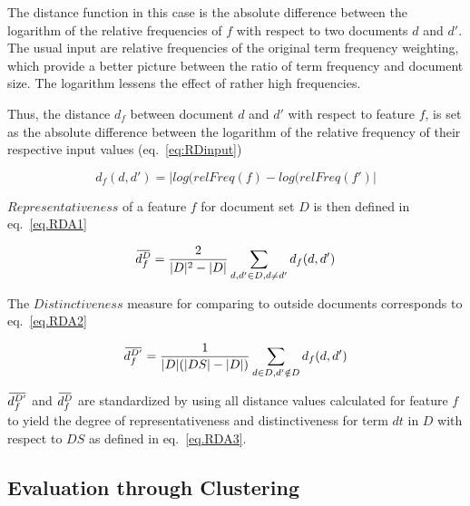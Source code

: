 \documentclass[a4paper,10pt,twoside,fleqn]{article}
\newcommand{\overbar}[1]{\mkern 2.0mu\overline{\mkern-2.0mu#1\mkern-2.0mu}\mkern 2.0mu}
\begin{document}
The distance function in this case is the absolute difference between the logarithm of the relative 
frequencies of $f$ with respect to two documents $d$ and $d'$.
The usual input are relative frequencies of the original term frequency weighting, which provide a 
better picture between the ratio of term frequency and document size. 
The logarithm lessens the effect of rather high frequencies. %



Thus, the distance $d_f$ between document $d$ and $d'$ with respect to feature $f$, is set as the 
absolute difference between
the logarithm of the relative frequency of their respective
input values (eq.~\ref{eq:RDinput})



\begin{equation} \label{eq:RDinput}
 d_f(d,d') = |log(relFreq(f) - log(relFreq(f')|
\end{equation}


 
$Representativeness$ of a feature $f$ for document set $D$ is then defined in eq.~\ref{eq.RDA1}


\begin{equation}\label{eq.RDA1}
 \overbar{d_f^{D}} = \frac{2}{|D|^2 -|D|} \sum\limits_{d,d' \in D,d \neq d'} d_f(d,d')
\end{equation}


The $Distinctiveness$ measure for comparing to outside documents corresponds to eq.~\ref{eq.RDA2}


\begin{equation}\label{eq.RDA2}
 \overbar{d_f^{D'}} = \frac{1}{|D|(|DS| -|D|)} \sum\limits_{d \in D, d'\notin D} d_f(d,d')
\end{equation}


 
$\overbar{d_f^{D'}}$  and $\overbar{d_f^{D}}$ are standardized by using all distance values calculated for feature $f$ to yield the 
degree of representativeness and distinctiveness for
term $dt$ in $D$ with respect to $DS$ as defined in eq.~\ref{eq.RDA3}.
 

 
\subsection{Evaluation through Clustering}
\end{document}
